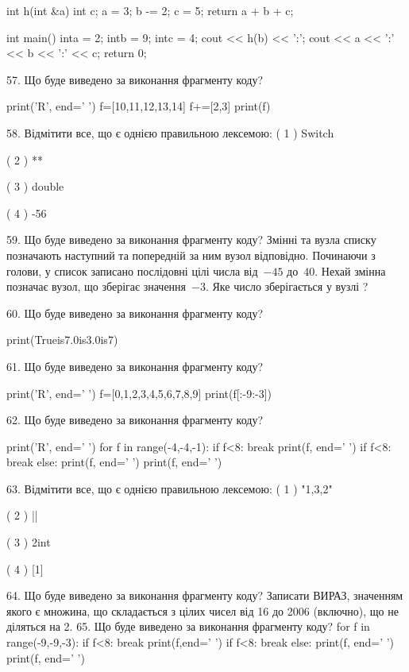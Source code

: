 \documentclass[11pt]{article}
\begin{document}
int h(int &a){
int c;    a = 3;
    b -= 2;
    c = 5;
    return a + b + c;
}

int main(){
    inta = 2;
    intb = 9;
    intc = 4;
    cout << h(b) << ':';
    cout << a << ':' << b << ':' << c;
    return 0; 
}

57. Що буде виведено за виконання фрагменту коду?

print('R', end=' ')
f=[10,11,12,13,14]
f+=[2,3]
print(f)


58. %
Відмітити все, що є однією правильною лексемою:
( 1 ) Switch

( 2 ) **

( 3 ) double

( 4 ) -56

59. Що буде виведено за виконання фрагменту коду?
Змінні  та  вузла списку позначають наступний та попередній за ним вузол відповідно. Починаючи з голови, у список записано послідовні цілі числа від~$-45$ до~$40$. Нехай змінна  позначає вузол, що зберігає значення~$-3$.
Яке число зберігається у вузлі  ?

60. Що буде виведено за виконання фрагменту коду?

print(Trueis7.0is3.0is7)

61. Що буде виведено за виконання фрагменту коду?

print('R', end=' ')
f=[0,1,2,3,4,5,6,7,8,9]
print(f[:-9:-3])


62. Що буде виведено за виконання фрагменту коду?

print('R', end=' ')
for f in range(-4,-4,-1):
    if f<8:
        break
        print(f, end=' ')
    if f<8:
        break
    else:
        print(f, end=' ')
    print(f, end=' ')

63. %
Відмітити все, що є однією правильною лексемою:
( 1 ) "1,3,2"

( 2 ) ||

( 3 ) 2int

( 4 ) [1]

64. Що буде виведено за виконання фрагменту коду?
Записати ВИРАЗ, значенням якого є множина, що складається з цілих чисел від 16 до 2006 (включно), що не діляться на 2.
65. Що буде виведено за виконання фрагменту коду?
for f in range(-9,-9,-3):
    if f<8:
        break
        print(f,end=' ')
    if f<8:
        break
else:
    print(f, end=' ')
print(f, end=' ')
\end{document}
